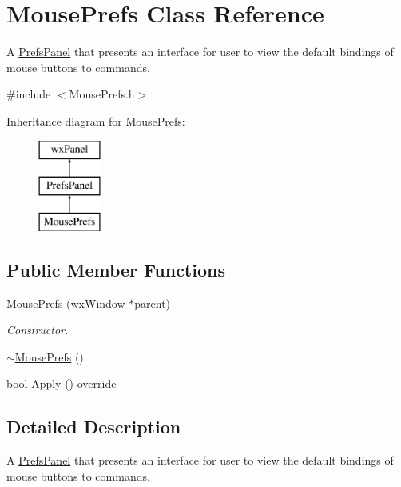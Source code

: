 \hypertarget{class_mouse_prefs}{}\section{Mouse\+Prefs Class Reference}
\label{class_mouse_prefs}


A \hyperlink{class_prefs_panel}{Prefs\+Panel} that presents an interface for user to view the default bindings of mouse buttons to commands.  




{\ttfamily \#include $<$Mouse\+Prefs.\+h$>$}

Inheritance diagram for Mouse\+Prefs\+:\begin{figure}[H]
\begin{center}
\leavevmode
\includegraphics[height=3.000000cm]{class_mouse_prefs}
\end{center}
\end{figure}
\subsection*{Public Member Functions}
\begin{DoxyCompactItemize}
\item 
\hyperlink{class_mouse_prefs_a8908ddd34ebdf73806c65903ecb365b7}{Mouse\+Prefs} (wx\+Window $\ast$parent)
\begin{DoxyCompactList}\small\item\em Constructor. \end{DoxyCompactList}\item 
\hyperlink{class_mouse_prefs_ad44a06f9ab2b5419b654a9b62586ce0e}{$\sim$\+Mouse\+Prefs} ()
\item 
\hyperlink{mac_2config_2i386_2lib-src_2libsoxr_2soxr-config_8h_abb452686968e48b67397da5f97445f5b}{bool} \hyperlink{class_mouse_prefs_a4f0f969737e3011e39c00c2f1d0c8182}{Apply} () override
\end{DoxyCompactItemize}


\subsection{Detailed Description}
A \hyperlink{class_prefs_panel}{Prefs\+Panel} that presents an interface for user to view the default bindings of mouse buttons to commands. 

